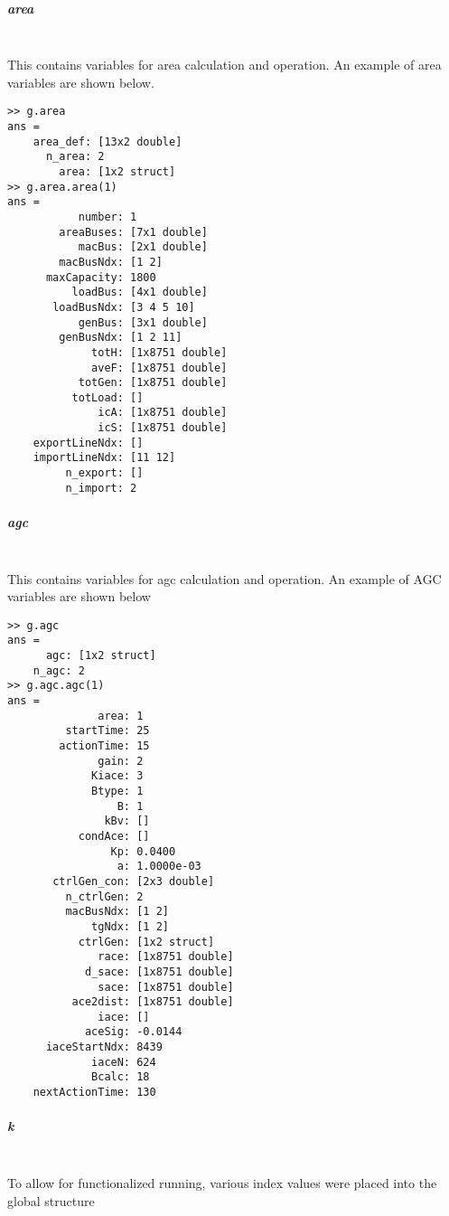 \documentclass[12pt]{article}
\begin{document}
\pagebreak
\subparagraph{area} \ \\
This contains variables for area calculation and operation.
An example of area variables are shown below.
\begin{verbatim}
>> g.area
ans = 
    area_def: [13x2 double]
      n_area: 2
        area: [1x2 struct]
>> g.area.area(1)
ans = 
           number: 1
        areaBuses: [7x1 double]
           macBus: [2x1 double]
        macBusNdx: [1 2]
      maxCapacity: 1800
          loadBus: [4x1 double]
       loadBusNdx: [3 4 5 10]
           genBus: [3x1 double]
        genBusNdx: [1 2 11]
             totH: [1x8751 double]
             aveF: [1x8751 double]
           totGen: [1x8751 double]
          totLoad: []
              icA: [1x8751 double]
              icS: [1x8751 double]
    exportLineNdx: []
    importLineNdx: [11 12]
         n_export: []
         n_import: 2
\end{verbatim}


\pagebreak
\subparagraph{agc} \ \\
This contains variables for agc calculation and operation.
An example of AGC variables are shown below

\begin{verbatim}
>> g.agc
ans = 
      agc: [1x2 struct]
    n_agc: 2
>> g.agc.agc(1)
ans = 
              area: 1
         startTime: 25
        actionTime: 15
              gain: 2
             Kiace: 3
             Btype: 1
                 B: 1
               kBv: []
           condAce: []
                Kp: 0.0400
                 a: 1.0000e-03
       ctrlGen_con: [2x3 double]
         n_ctrlGen: 2
         macBusNdx: [1 2]
             tgNdx: [1 2]
           ctrlGen: [1x2 struct]
              race: [1x8751 double]
            d_sace: [1x8751 double]
              sace: [1x8751 double]
          ace2dist: [1x8751 double]
              iace: []
            aceSig: -0.0144
      iaceStartNdx: 8439
             iaceN: 624
             Bcalc: 18
    nextActionTime: 130
\end{verbatim}

\pagebreak

\subparagraph{k} \ \\
To allow for functionalized running, various index values were placed into the global structure
\end{document}
